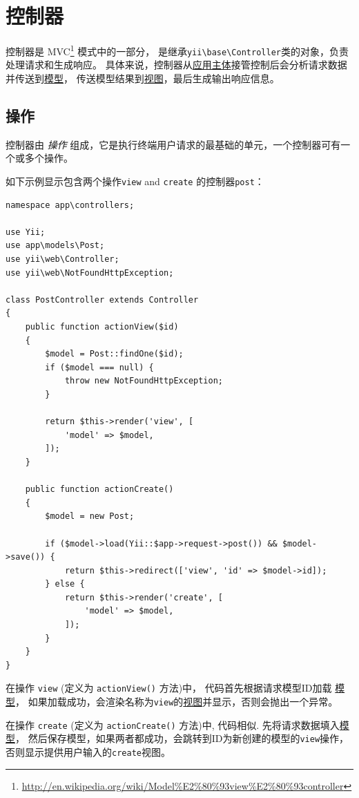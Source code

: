 \label{structure-controllers.md}\section{控制器}
控制器是 MVC\footnote{\url{http://en.wikipedia.org/wiki/Model\%E2\%80\%93view\%E2\%80\%93controller}} 模式中的一部分，
是继承\texttt{yii{\allowbreak{}\textbackslash}base{\allowbreak{}\textbackslash}Controller}类的对象，负责处理请求和生成响应。
具体来说，控制器从\hyperref[structure-applications.md]{应用主体}接管控制后会分析请求数据并传送到\hyperref[structure-models.md]{模型}，
传送模型结果到\hyperref[structure-views.md]{视图}，最后生成输出响应信息。

\subsection{操作 \label{structure-controllers.md::actions}}
控制器由 \textit{操作} 组成，它是执行终端用户请求的最基础的单元，一个控制器可有一个或多个操作。

如下示例显示包含两个操作\lstinline|view| and \lstinline|create| 的控制器\lstinline|post|：

\lstset{language=php}\begin{lstlisting}
namespace app\controllers;

use Yii;
use app\models\Post;
use yii\web\Controller;
use yii\web\NotFoundHttpException;

class PostController extends Controller
{
    public function actionView($id)
    {
        $model = Post::findOne($id);
        if ($model === null) {
            throw new NotFoundHttpException;
        }

        return $this->render('view', [
            'model' => $model,
        ]);
    }

    public function actionCreate()
    {
        $model = new Post;

        if ($model->load(Yii::$app->request->post()) && $model->save()) {
            return $this->redirect(['view', 'id' => $model->id]);
        } else {
            return $this->render('create', [
                'model' => $model,
            ]);
        }
    }
}
\end{lstlisting}
在操作 \lstinline|view| (定义为 \lstinline|actionView()| 方法)中， 代码首先根据请求模型ID加载 \hyperref[structure-models.md]{模型}，
如果加载成功，会渲染名称为\lstinline|view|的\hyperref[structure-views.md]{视图}并显示，否则会抛出一个异常。

在操作 \lstinline|create| (定义为 \lstinline|actionCreate()| 方法)中, 代码相似. 先将请求数据填入\hyperref[structure-models.md]{模型}，
然后保存模型，如果两者都成功，会跳转到ID为新创建的模型的\lstinline|view|操作，否则显示提供用户输入的\lstinline|create|视图。


